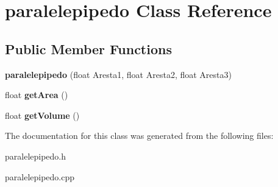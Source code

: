 \hypertarget{classparalelepipedo}{}\section{paralelepipedo Class Reference}
\label{classparalelepipedo}
\subsection*{Public Member Functions}
\begin{DoxyCompactItemize}
\item 
\mbox{\label{classparalelepipedo_a6e79667bf9e689881ac538f9eb7d558a}} 
{\bfseries paralelepipedo} (float Aresta1, float Aresta2, float Aresta3)
\item 
\mbox{\label{classparalelepipedo_a10c9308080ebd3e8e0dc68183111b272}} 
float {\bfseries get\+Area} ()
\item 
\mbox{\label{classparalelepipedo_af79e9fe7f95661e7747dd5d233c564fb}} 
float {\bfseries get\+Volume} ()
\end{DoxyCompactItemize}


The documentation for this class was generated from the following files\+:\begin{DoxyCompactItemize}
\item 
paralelepipedo.\+h\item 
paralelepipedo.\+cpp\end{DoxyCompactItemize}
